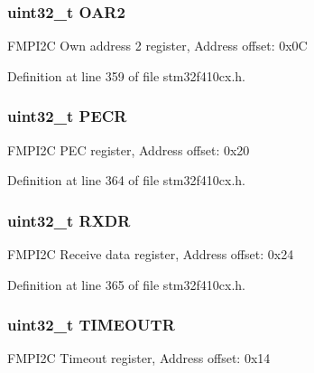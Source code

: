 \subsubsection[{\texorpdfstring{O\+A\+R2}{OAR2}}]{ uint32\+\_\+t O\+A\+R2}\hypertarget{struct_f_m_p_i2_c___type_def_ab5c57ffed0351fa064038939a6c0bbf6}{}\label{struct_f_m_p_i2_c___type_def_ab5c57ffed0351fa064038939a6c0bbf6}
F\+M\+P\+I2C Own address 2 register, Address offset\+: 0x0C 

Definition at line 359 of file stm32f410cx.\+h.

\subsubsection[{\texorpdfstring{P\+E\+CR}{PECR}}]{ uint32\+\_\+t P\+E\+CR}\hypertarget{struct_f_m_p_i2_c___type_def_af427631ab4515bb1f16bf5869682c18b}{}\label{struct_f_m_p_i2_c___type_def_af427631ab4515bb1f16bf5869682c18b}
F\+M\+P\+I2C P\+EC register, Address offset\+: 0x20 

Definition at line 364 of file stm32f410cx.\+h.

\subsubsection[{\texorpdfstring{R\+X\+DR}{RXDR}}]{ uint32\+\_\+t R\+X\+DR}\hypertarget{struct_f_m_p_i2_c___type_def_a9bf29a9104cb5569823ab892174f9c8c}{}\label{struct_f_m_p_i2_c___type_def_a9bf29a9104cb5569823ab892174f9c8c}
F\+M\+P\+I2C Receive data register, Address offset\+: 0x24 

Definition at line 365 of file stm32f410cx.\+h.

\subsubsection[{\texorpdfstring{T\+I\+M\+E\+O\+U\+TR}{TIMEOUTR}}]{ uint32\+\_\+t T\+I\+M\+E\+O\+U\+TR}\hypertarget{struct_f_m_p_i2_c___type_def_a95187d83f061ebbddd8668d0db3fbaa5}{}\label{struct_f_m_p_i2_c___type_def_a95187d83f061ebbddd8668d0db3fbaa5}
F\+M\+P\+I2C Timeout register, Address offset\+: 0x14 

